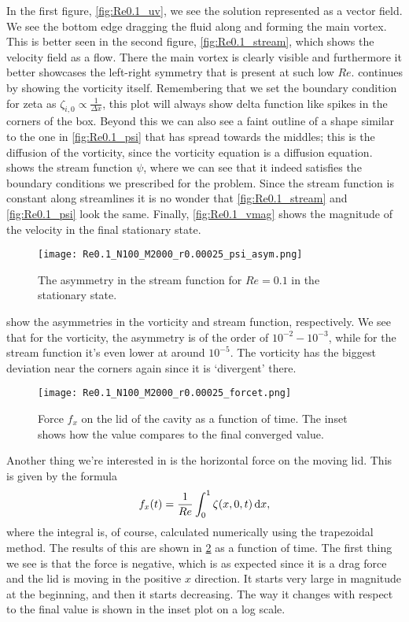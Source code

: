 \documentclass[10pt,a4paper,twocolumn]{article}
\begin{document}
In the first figure, \cref{fig:Re0.1_uv}, we see the solution represented as a vector field. We see the bottom edge dragging the fluid along and forming the main vortex. This is better seen in the second figure, \cref{fig:Re0.1_stream}, which shows the velocity field as a flow. There the main vortex is clearly visible and furthermore it better showcases the left-right symmetry that is present at such low $Re$.  continues by showing the vorticity itself. Remembering that we set the boundary condition for zeta as $\zeta_{i,0} \propto \frac{1}{\Delta x}$, this plot will always show delta function like spikes in the corners of the box. Beyond this we can also see a faint outline of a shape similar to the one in \cref{fig:Re0.1_psi} that has spread towards the middles; this is the diffusion of the vorticity, since the vorticity equation is a diffusion equation.  shows the stream function $\psi$, where we can see that it indeed satisfies the boundary conditions we prescribed for the problem. Since the stream function is constant along streamlines it is no wonder that \cref{fig:Re0.1_stream} and \cref{fig:Re0.1_psi} look the same. Finally, \cref{fig:Re0.1_vmag} shows the magnitude of the velocity in the final stationary state.

\begin{figure}[!h]
    \centering
    \texttt{[image: Re0.1\_N100\_M2000\_r0.00025\_psi\_asym.png]}
    \caption{The asymmetry in the stream function for $Re=0.1$ in the stationary state.}
    \label{fig:Re0.1_psi_asym}
\end{figure}

 show the asymmetries in the vorticity and stream function, respectively. We see that for the vorticity, the asymmetry is of the order of $10^{-2} - 10^{-3}$, while for the stream function it's even lower at around $10^{-5}$. The vorticity has the biggest deviation near the corners again since it is `divergent' there.

\begin{figure}[!h]
    \centering
    \texttt{[image: Re0.1\_N100\_M2000\_r0.00025\_forcet.png]}
    \caption{Force $f_x$ on the lid of the cavity as a function of time. The inset shows how the value compares to the final converged value.}
    \label{fig:Re0.1_forcet}
\end{figure}

Another thing we're interested in is the horizontal force on the moving lid. This is given by the formula
%
\begin{align}
    f_x(t) = \frac{1}{Re} \int_0^1 \zeta(x,0,t) \dif x,
\end{align}
%
where the integral is, of course, calculated numerically using the trapezoidal method. The results of this are shown in \cref{fig:Re0.1_forcet} as a function of time. The first thing we see is that the force is negative, which is as expected since it is a drag force and the lid is moving in the positive $x$ direction. It starts very large in magnitude at the beginning, and then it starts decreasing. The way it changes with respect to the final value is shown in the inset plot on a log scale.
\end{document}
